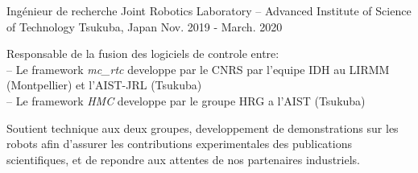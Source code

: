 
\begin{cventries}

  \cventry
    {Ingénieur de recherche} %
    {Joint Robotics Laboratory -- Advanced Institute of Science of Technology} %
    {Tsukuba, Japan} %
    {Nov. 2019 - March. 2020} %
    {
      \begin{cvitems} %
        \item Responsable de la fusion des logiciels de controle entre:\\
          -- Le framework \emph{mc\_rtc} developpe par le CNRS par l'equipe IDH au LIRMM (Montpellier) et l'AIST-JRL (Tsukuba)\\
          -- Le framework \emph{HMC} developpe par le groupe HRG a l'AIST (Tsukuba)
        \item Soutient technique aux deux groupes, developpement de demonstrations sur les robots afin d'assurer les contributions experimentales des publications scientifiques, et de repondre aux attentes de nos partenaires industriels.
      \end{cvitems}
    }


\end{cventries}
